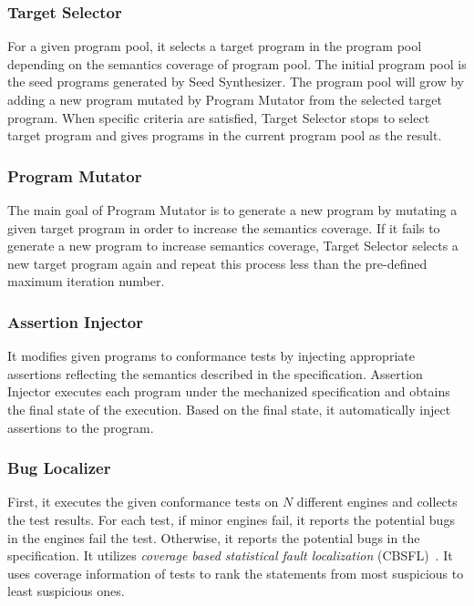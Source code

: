 \subsubsection{Target Selector}
For a given program pool, it selects a target program in the program pool
depending on the semantics coverage of program pool.  The initial program pool
is the seed programs generated by \textsf{Seed Synthesizer}. The program pool
will grow by adding a new program mutated by \textsf{Program Mutator} from
the selected target program.  When specific criteria are satisfied,
\textsf{Target Selector} stops to select target program and gives programs in
the current program pool as the result.
\newline

\subsubsection{Program Mutator}
The main goal of \textsf{Program Mutator} is to generate a new program by
mutating a given target program in order to increase the semantics coverage.
If it fails to generate a new program to increase semantics coverage,
\textsf{Target Selector} selects a new target program again and repeat this
process less than the pre-defined maximum iteration number.
\newline

\subsubsection{Assertion Injector}
It modifies given programs to conformance tests by injecting appropriate
assertions reflecting the semantics described in the specification.
\textsf{Assertion Injector} executes each program under the mechanized
specification and obtains the final state of the execution.  Based on the final
state, it automatically inject assertions to the program.
\newline

\subsubsection{Bug Localizer}
First, it executes the given conformance tests on $N$ different engines and
collects the test results.  For each test, if minor engines fail,
it reports the potential bugs in the engines fail the test.  Otherwise, it
reports the potential bugs in the specification.  It utilizes \textit{coverage
based statistical fault localization} (CBSFL)~\cite{fault-local}.  It uses coverage
information of tests to rank the statements from most suspicious to least
suspicious ones.

